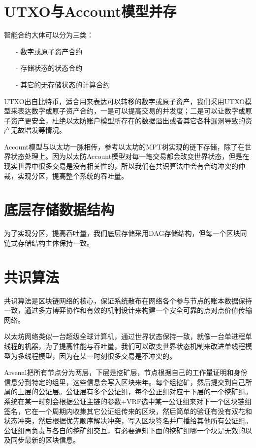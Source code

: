 \documentclass[UTF8]{ctexart}
\begin{document}
\section{UTXO与Account模型并存}

智能合约大体可以分为三类：

\begin{itemize}
\item[-]数字或原子资产合约
\item[-]存储状态的状态合约
\item[-]其它的无存储状态的计算合约
\end{itemize}

UTXO出自比特币，适合用来表达可以转移的数字或原子资产，我们采用UTXO模型来表达数字或原子资产合约，一是可以提高交易的并发度；二是可以让数字或原子资产更安全，杜绝以太防账户模型所存在的数据溢出或者其它各种漏洞导致的资产无故增发等情况。

Account模型与以太坊一脉相传，参考以太坊的MPT树实现的链下存储，除了在世界状态处理上。因为以太防Account模型对每一笔交易都会改变世界状态，但是在现实世界中很多交易是没有相关性的，所以我们在共识算法中会有合约冲突的仲裁，实现分区，提高整个系统的吞吐量。

\section{底层存储数据结构}

为了实现分区，提高吞吐量，我们底层存储采用DAG存储结构，但每一个区块同链式存储结构主体保持一致。

\section{共识算法}

共识算法是区块链网络的核心，保证系统散布在网络各个参与节点的账本数据保持一致，通过多方博弈协作和有效的机制设计来构建一个安全可靠的点对点价值传输网络。

以太坊网络类似一台超级全球计算机，通过世界状态保持一致，就像一台单进程单线程的机器，为了提高性能与吞吐量，我们可以改变世界状态机制来改进单线程模型为多线程模型，因为在某一时刻很多交易是不冲突的。

Arsenal把所有节点分为两层，下层是挖矿层，节点根据自己的工作量证明和身份信息分到特定的组里，这些信息会写入区块来年。每个组挖矿，然后提交到自己所属的上层的公证层。公证层有多个公证组，每个公正组对应于下层的一个挖矿组。系统在某一时刻会根据公证主链的参数+VRF选中某一公证组来对下一个区块链组签名，它在一个周期内收集其它公证组传来的区块，然后简单的验证有没有双花和状态冲突，然后根据优先顺序解决冲突，写入区块签名并广播给其他所有公证组。公证组再负责与各自的挖矿组交互，有必要通知下面的挖矿组哪一个块是无效的以及同步最新的区块信息。
\end{document}
